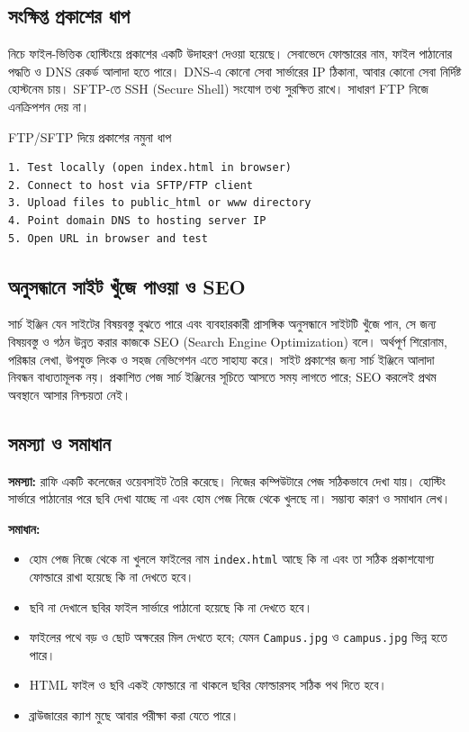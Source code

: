 \subsection{সংক্ষিপ্ত প্রকাশের ধাপ}

নিচে ফাইল-ভিত্তিক হোস্টিংয়ে প্রকাশের একটি উদাহরণ দেওয়া হয়েছে। সেবাভেদে ফোল্ডারের নাম, ফাইল পাঠানোর পদ্ধতি ও DNS রেকর্ড আলাদা হতে পারে। DNS-এ কোনো সেবা সার্ভারের IP ঠিকানা, আবার কোনো সেবা নির্দিষ্ট হোস্টনেম চায়। SFTP-তে SSH (Secure Shell) সংযোগ তথ্য সুরক্ষিত রাখে। সাধারণ FTP নিজে এনক্রিপশন দেয় না।

\begin{examplebox}{FTP/SFTP দিয়ে প্রকাশের নমুনা ধাপ}
\begin{verbatim}
1. Test locally (open index.html in browser)
2. Connect to host via SFTP/FTP client
3. Upload files to public_html or www directory
4. Point domain DNS to hosting server IP
5. Open URL in browser and test
\end{verbatim}
\end{examplebox}


\subsection{অনুসন্ধানে সাইট খুঁজে পাওয়া ও SEO}
সার্চ ইঞ্জিন যেন সাইটের বিষয়বস্তু বুঝতে পারে এবং ব্যবহারকারী প্রাসঙ্গিক অনুসন্ধানে সাইটটি খুঁজে পান, সে জন্য বিষয়বস্তু ও গঠন উন্নত করার কাজকে SEO (Search Engine Optimization) বলে। অর্থপূর্ণ শিরোনাম, পরিষ্কার লেখা, উপযুক্ত লিংক ও সহজ নেভিগেশন এতে সাহায্য করে। সাইট প্রকাশের জন্য সার্চ ইঞ্জিনে আলাদা নিবন্ধন বাধ্যতামূলক নয়। প্রকাশিত পেজ সার্চ ইঞ্জিনের সূচিতে আসতে সময় লাগতে পারে; SEO করলেই প্রথম অবস্থানে আসার নিশ্চয়তা নেই।

\subsection{সমস্যা ও সমাধান}

\begin{practicebox}
\textbf{সমস্যা:} রাফি একটি কলেজের ওয়েবসাইট তৈরি করেছে। নিজের কম্পিউটারে পেজ সঠিকভাবে দেখা যায়। হোস্টিং সার্ভারে পাঠানোর পরে ছবি দেখা যাচ্ছে না এবং হোম পেজ নিজে থেকে খুলছে না। সম্ভাব্য কারণ ও সমাধান লেখ।

\textbf{সমাধান:}
\begin{itemize}
\item হোম পেজ নিজে থেকে না খুললে ফাইলের নাম \texttt{index.html} আছে কি না এবং তা সঠিক প্রকাশযোগ্য ফোল্ডারে রাখা হয়েছে কি না দেখতে হবে।
\item ছবি না দেখালে ছবির ফাইল সার্ভারে পাঠানো হয়েছে কি না দেখতে হবে।
\item ফাইলের পথে বড় ও ছোট অক্ষরের মিল দেখতে হবে; যেমন \texttt{Campus.jpg} ও \texttt{campus.jpg} ভিন্ন হতে পারে।
\item HTML ফাইল ও ছবি একই ফোল্ডারে না থাকলে ছবির ফোল্ডারসহ সঠিক পথ দিতে হবে।
\item ব্রাউজারের ক্যাশ মুছে আবার পরীক্ষা করা যেতে পারে।
\end{itemize}
\end{practicebox}



